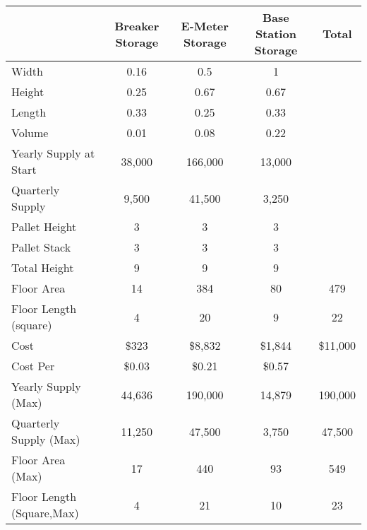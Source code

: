 \begin{table}[htbp]
\begin{center}
\begin{tabular}{|l|c|c|c|c|}
\rowcolor{lightgray} & Breaker Storage & E-Meter Storage & Base Station Storage & Total \\\hline
Width & 0.16 & 0.5 & 1 & \\\hline
Height & 0.25 & 0.67 & 0.67 & \\\hline
Length & 0.33 & 0.25 & 0.33 & \\\hline
Volume & 0.01 & 0.08 & 0.22 & \\\hline\hline
Yearly Supply at Start & 38,000 & 166,000 & 13,000 & \\\hline
Quarterly Supply & 9,500 & 41,500 & 3,250 & \\\hline\hline
Pallet Height & 3 & 3 & 3 & \\\hline
Pallet Stack  & 3 & 3 & 3 & \\\hline
Total Height & 9 & 9 & 9 & \\\hline\hline
Floor Area & 14 & 384 & 80 & 479 \\\hline
Floor Length (square) & 4 & 20 & 9 & 22\\\hline\hline
Cost & \$323 & \$8,832 & \$1,844 & \$11,000\\\hline
Cost Per & \$0.03 & \$0.21 & \$0.57 & \\\hline\hline
Yearly Supply (Max) & 44,636 & 190,000 & 14,879 & 190,000\\\hline
Quarterly Supply (Max) & 11,250 & 47,500 & 3,750 & 47,500\\\hline\hline
Floor Area (Max) & 17 & 440 & 93 & 549 \\\hline
Floor Length (Square,Max) & 4 & 21 & 10 & 23\\\hline

\end{tabular}
\end{center}
\end{table}

